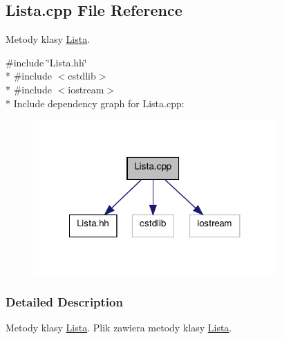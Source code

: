 \hypertarget{a00009}{\subsection{Lista.\-cpp File Reference}
\label{a00009}
}


Metody klasy \hyperlink{a00003}{Lista}.  


{\ttfamily \#include \char`\"{}Lista.\-hh\char`\"{}}\\*
{\ttfamily \#include $<$cstdlib$>$}\\*
{\ttfamily \#include $<$iostream$>$}\\*
Include dependency graph for Lista.\-cpp\-:\nopagebreak
\begin{figure}[H]
\begin{center}
\leavevmode
\includegraphics[width=264pt]{a00020}
\end{center}
\end{figure}


\subsubsection{Detailed Description}
Metody klasy \hyperlink{a00003}{Lista}. Plik zawiera metody klasy \hyperlink{a00003}{Lista}. 